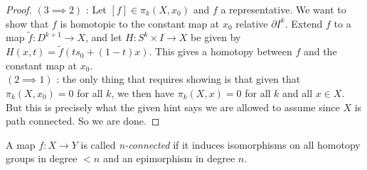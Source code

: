 \begin{proof}
        \linebreak
        $(3 \implies 2)$ : 
        Let $\left[ f \right] \in \pi_k(X, x_0)$ and
        $f$ a representative. 
        We want to show that $f$ is homotopic to the
        constant map at $x_0$ relative $\partial I^{k}$.
        Extend $f$ to a map 
        $\tilde{f} \colon D^{k+1} \to X$, and let
        $H \colon S^{k} \times I \to X$ be given by
        $H\left( x,t \right) =
        \tilde{f}\left( ts_0 + (1-t) x \right) $. This gives
        a homotopy between $f$ and the constant map
        at  $x_0$.\\
        \linebreak
        $\left( 2 \implies 1 \right) $ : the only thing that
        requires showing is that
        given that $\pi_k(X, x_0) = 0$ for all $k$, we then
        have $\pi_k \left( X, x \right) = 0$ for all $k$ and
        all $x \in X$. But this is precisely what the given
        hint says we are allowed to assume since
        $X$ is path connected. So we are done.
    \end{proof}

    \begin{definition}
        A map $f \colon X \to Y$ is called \textit{n-connected}
        if it induces isomorphisms on all homotopy
        groups in degree $<n$ and an epimorphism
        in degree $n$.
    \end{definition}





